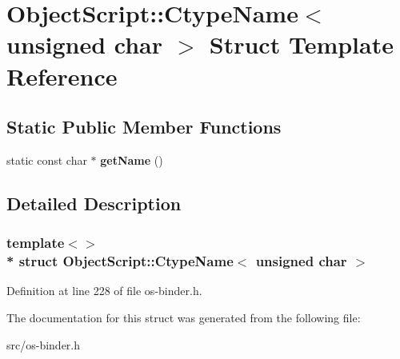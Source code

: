 \hypertarget{struct_object_script_1_1_ctype_name_3_01unsigned_01char_01_4}{}\section{Object\+Script\+:\+:Ctype\+Name$<$ unsigned char $>$ Struct Template Reference}
\label{struct_object_script_1_1_ctype_name_3_01unsigned_01char_01_4}
\subsection*{Static Public Member Functions}
\begin{DoxyCompactItemize}
\item 
static const char $\ast$ {\bfseries get\+Name} ()\hypertarget{struct_object_script_1_1_ctype_name_3_01unsigned_01char_01_4_aa5b67f3e25de2219f3053b30b9167648}{}\label{struct_object_script_1_1_ctype_name_3_01unsigned_01char_01_4_aa5b67f3e25de2219f3053b30b9167648}

\end{DoxyCompactItemize}


\subsection{Detailed Description}
\subsubsection*{template$<$$>$\\*
struct Object\+Script\+::\+Ctype\+Name$<$ unsigned char $>$}



Definition at line 228 of file os-\/binder.\+h.



The documentation for this struct was generated from the following file\+:\begin{DoxyCompactItemize}
\item 
src/os-\/binder.\+h\end{DoxyCompactItemize}
